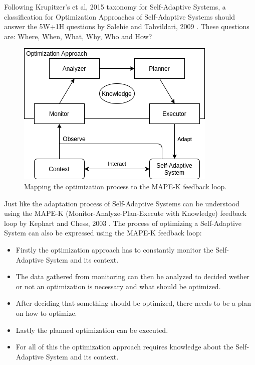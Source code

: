 Following Krupitzer's et al, 2015 \cite*{SurveyOnEngineeringApproaches} taxonomy for Self-Adaptive Systems,
a classification for Optimization Approaches of Self-Adaptive Systems should answer 
the 5W+1H questions by Salehie and Tahvildari, 2009 \cite*{LandscapeAndResearchChallenges}.
These questions are: Where, When, What, Why, Who and How?

\begin{figure}[h!]
    \centering
    \includegraphics[width=0.6\columnwidth]{images/ClassificationProposal-OptimizationMAPEK.png}
    \caption{Mapping the optimization process to the MAPE-K feedback loop.}
    \label{fig:MappingOptMAPEK}
\end{figure}

Just like the adaptation process of Self-Adaptive Systems can be understood using
the MAPE-K (Monitor-Analyze-Plan-Execute with Knowledge) feedback loop by Kephart and Chess, 2003 \cite*{VisionOfAutonomicComputing}.
The process of optimizing a Self-Adaptive System can also be expressed using the MAPE-K feedback loop:
\begin{itemize}
    \item Firstly the optimization approach has to constantly monitor the Self-Adaptive System and its context.
    \item The data gathered from monitoring can then be analyzed to decided wether or not an optimization is necessary and what should be optimized.
    \item After deciding that something should be optimized, there needs to be a plan on how to optimize.
    \item Lastly the planned optimization can be executed.
    \item For all of this the optimization approach requires knowledge about the Self-Adaptive System and its context.
\end{itemize}

